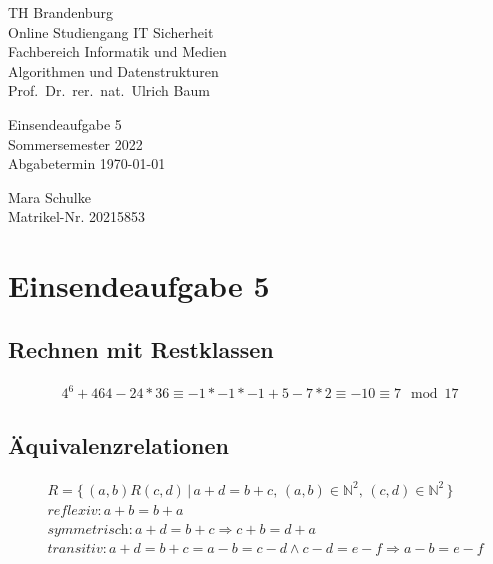 \documentclass{article}
\begin{document}
\begin{titlepage}
	\begin{flushleft}
		TH Brandenburg\\
		Online Studiengang IT Sicherheit\\
		Fachbereich Informatik und Medien\\
		Algorithmen und Datenstrukturen\\
		Prof.\ Dr.\ rer.\ nat.\ Ulrich Baum
	\end{flushleft}

	\vfill

	\begin{center}
		\Large{Einsendeaufgabe 5}\\[0.5em]
		\large{Sommersemester 2022}\\[0.25em]
		\large{Abgabetermin \today}
	\end{center}

	\vfill

	\begin{flushright}
		Mara Schulke \\
		Matrikel-Nr. 20215853
	\end{flushright}
\end{titlepage}

\newpage

\section*{Einsendeaufgabe 5}

\subsection{Rechnen mit Restklassen}

\begin{align*}
	4^6 + 464 -24 * 36 \equiv -1 * -1 * -1 + 5 -7 * 2 \equiv -10 \equiv 7 \mod 17
\end{align*}

\subsection{Äquivalenzrelationen}

\begin{align*}
	& R = \{\,(a,b)R(c,d)\,|\,a + d = b + c,\, (a,b) \in \mathbb{N}^2,\, (c,d) \in \mathbb{N}^2\,\}\\
	& \textit{reflexiv}: a + b = b + a\\
	& \textit{symmetrisch}: a + d = b + c \Rightarrow c + b = d + a\\
	& \textit{transitiv}: a + d = b + c = a - b = c - d \land c - d = e - f \Rightarrow a - b = e - f\\
\end{align*}
\end{document}
